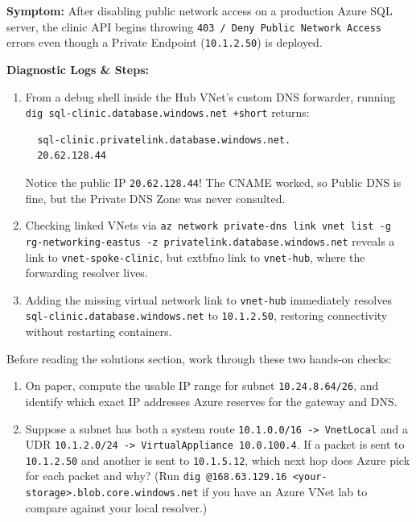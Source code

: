 \begin{realworldbox}
\textbf{Symptom:} After disabling public network access on a production Azure SQL server, the clinic API begins throwing \texttt{403 / Deny Public Network Access} errors even though a Private Endpoint (\texttt{10.1.2.50}) is deployed.

\textbf{Diagnostic Logs \& Steps:}
\begin{enumerate}[leftmargin=12pt]
  \item From a debug shell inside the Hub VNet's custom DNS forwarder, running \texttt{dig sql-clinic.database.windows.net +short} returns:
  \begin{verbatim}
  sql-clinic.privatelink.database.windows.net.
  20.62.128.44
  \end{verbatim}
  Notice the public IP \texttt{20.62.128.44}! The CNAME worked, so Public DNS is fine, but the Private DNS Zone was never consulted.
  \item Checking linked VNets via \texttt{az network private-dns link vnet list -g rg-networking-eastus -z privatelink.database.windows.net} reveals a link to \texttt{vnet-spoke-clinic}, but 	extbf{no link to \texttt{vnet-hub}}, where the forwarding resolver lives.
  \item Adding the missing virtual network link to \texttt{vnet-hub} immediately resolves \texttt{sql-clinic.database.windows.net} to \texttt{10.1.2.50}, restoring connectivity without restarting containers.
\end{enumerate}
\end{realworldbox}

\begin{tryityourselfbox}
Before reading the solutions section, work through these two hands-on checks:
\begin{enumerate}[leftmargin=12pt]
  \item On paper, compute the usable IP range for subnet \texttt{10.24.8.64/26}, and identify which exact IP addresses Azure reserves for the gateway and DNS.
  \item Suppose a subnet has both a system route \texttt{10.1.0.0/16 -> VnetLocal} and a UDR \texttt{10.1.2.0/24 -> VirtualAppliance 10.0.100.4}. If a packet is sent to \texttt{10.1.2.50} and another is sent to \texttt{10.1.5.12}, which next hop does Azure pick for each packet and why? (Run \texttt{dig @168.63.129.16 <your-storage>.blob.core.windows.net} if you have an Azure VNet lab to compare against your local resolver.)
\end{enumerate}
\end{tryityourselfbox}

